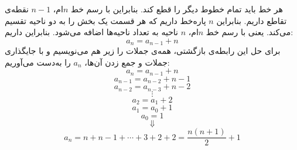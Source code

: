 \p
هر خط باید تمام خطوط دیگر را قطع کند. بنابراین با رسم خط
$n$ام،
$n - 1$
نقطه‌ی تقاطع داریم. بنابراین
$n$
پاره‌خط داریم که هر قسمت یک بخش را به دو ناحیه تقسیم می‌کند. یعنی با رسم خط
$n$ام،
$n$
ناحیه به تعداد ناحیه‌ها اضافه می‌شود. بنابراین داریم:
$$a_n = a_{n-1} + n$$
برای حل این رابطه‌ی بازگشتی، همه‌ی جملات را زیر هم می‌نویسیم و با جایگذاری جملات و جمع زدن آن‌ها،
$a_n$
را به‌دست می‌آوریم:
$$a_n = a_{n-1} + n$$
$$a_{n-1} = a_{n-2} + n - 1$$
$$a_{n-2} = a_{n-3} + n - 2$$
$$\vdots$$
$$a_{2} = a_1 + 2$$
$$a_{1} = a_0 + 1$$
$$a_0 = 1$$
$$\Downarrow$$
$$a_n = n + n - 1 + \cdots + 3 + 2 + 2 = \frac{n(n + 1)}{2} + 1$$